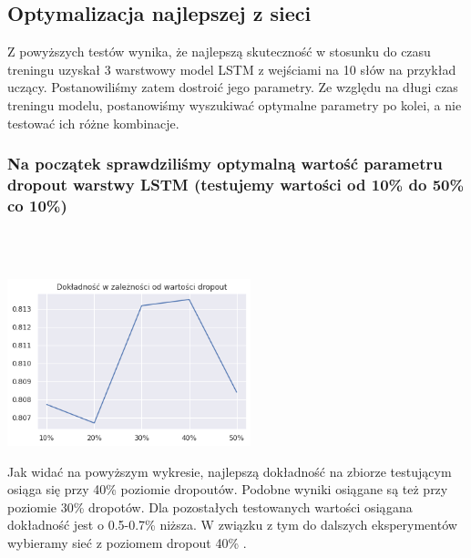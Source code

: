 \documentclass[11pt, a4paper, notitlepage]{report}
\begin{document}
\newpage
\subsection{Optymalizacja najlepszej z sieci}

Z powyższych testów wynika, że najlepszą skuteczność w stosunku do czasu treningu uzyskał 3 warstwowy model LSTM z wejściami na 10 słów na przykład uczący. Postanowiliśmy zatem dostroić jego parametry. Ze względu na długi czas treningu modelu, postanowiśmy wyszukiwać optymalne parametry po kolei, a nie testować ich różne kombinacje.
\subsubsection{Na początek sprawdziliśmy optymalną wartość parametru dropout warstwy LSTM (testujemy wartości od 10\% do 50\% co 10\%)}
\\ \\
\begin{center}
\includegraphics[width=200pt]{graphics/accuracy_dropout.png}
\end{center}
Jak widać na powyższym wykresie, najlepszą dokładność na zbiorze testującym osiąga się przy 40\% poziomie dropoutów. Podobne wyniki osiągane są też przy poziomie 30\% dropotów. Dla pozostałych testowanych wartości osiągana dokładność jest o 0.5-0.7\% niższa. W związku z tym do dalszych eksperymentów wybieramy sieć z poziomem dropout 40\% .
\end{document}
